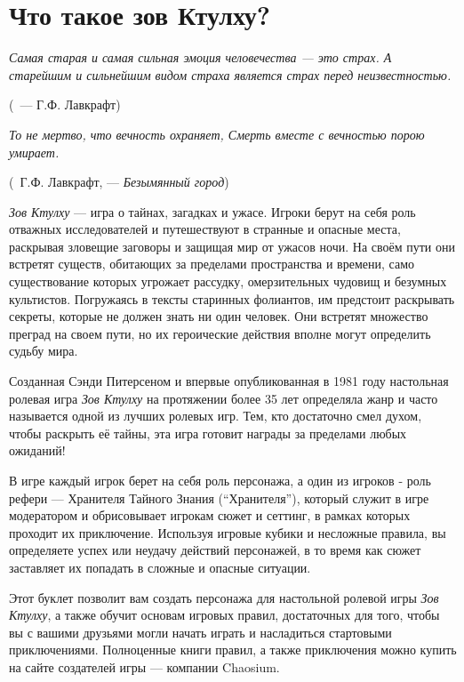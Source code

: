 \documentclass[letterpaper,twocolumn,openany, twoside, 11pt, usenames]{cocbook}
\renewenvironment{quote}{%
   \list{}{%
     \leftmargin0.0cm   %
     \rightmargin\leftmargin
   }
   \item\relax
}
{\endlist}
\let\oldquote\quote
\let\endoldquote\endquote
\renewenvironment{quote}[2][]
  {\if\relax\detokenize{#1}\relax
     \def\quoteauthor{~#2}%
   \fi
   \oldquote}
  {\par\nobreak\smallskip\hfill(\quoteauthor)%
   \endoldquote\addvspace{\bigskipamount}}
\begin{document}
\scriptsize

\section*{\nohyphens{Что такое зов Ктулху?}}
\begin{quote}{--- Г.Ф. Лавкрафт}
{\it Самая старая и самая сильная эмоция человечества --- это страх. А старейшим и сильнейшим видом страха является страх перед неизвестностью.}
\end{quote}

\begin{quote}{Г.Ф. Лавкрафт, --- {\it Безымянный город}}
{\it То не мертво, что вечность охраняет, Смерть вместе с вечностью порою умирает.}
\end{quote}

{\it Зов Ктулху} --- игра о тайнах, загадках и ужасе. Игроки берут на себя роль отважных исследователей и путешествуют в странные и опасные места, раскрывая зловещие заговоры и защищая мир от ужасов ночи. На своём пути они встретят существ, обитающих за пределами пространства и времени, само существование которых угрожает рассудку, омерзительных чудовищ и безумных культистов. Погружаясь в тексты старинных фолиантов, им предстоит раскрывать секреты, которые не должен знать ни один человек. Они встретят множество преград на своем пути, но их героические действия вполне могут определить судьбу мира.

Созданная Сэнди Питерсеном и впервые опубликованная в 1981 году настольная ролевая игра {\it Зов Ктулху} на протяжении более 35 лет определяла жанр и часто называется одной из лучших ролевых игр. Тем, кто достаточно смел духом, чтобы раскрыть её тайны, эта игра готовит награды за пределами любых ожиданий!

В игре каждый игрок берет на себя роль персонажа, а один из игроков - роль рефери --- Хранителя Тайного Знания (``Хранителя''), который служит в игре модератором и обрисовывает игрокам сюжет и сеттинг, в рамках которых проходит их приключение. Используя игровые кубики и несложные правила, вы определяете успех или неудачу действий персонажей, в то время как сюжет заставляет их попадать в сложные и опасные ситуации.

Этот буклет позволит вам создать персонажа для настольной ролевой игры {\it Зов Ктулху}, а также обучит основам игровых правил, достаточных для того, чтобы вы с вашими друзьями могли начать играть и насладиться стартовыми приключениями. Полноценные книги правил, а также приключения можно купить на сайте создателей игры --- компании Chaosium.
\end{document}
